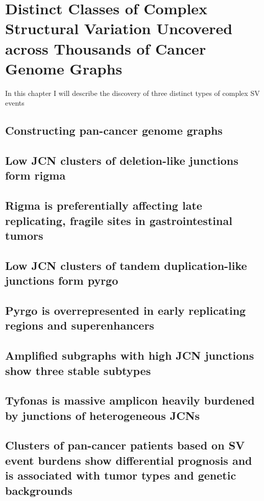 \documentclass[phd,tocprelim]{cornell}
\begin{document}
\chapter{Distinct Classes of Complex Structural Variation Uncovered across Thousands of Cancer Genome Graphs}
In this chapter I will describe the discovery of three distinct types of complex SV events 

\section{Constructing pan-cancer genome graphs}

\section{Low JCN clusters of deletion-like junctions form rigma}

\section{Rigma is preferentially affecting late replicating, fragile sites in gastrointestinal tumors}

\section{Low JCN clusters of tandem duplication-like junctions form pyrgo}

\section{Pyrgo is overrepresented in early replicating regions and superenhancers}

\section{Amplified subgraphs with high JCN junctions show three stable subtypes}

\section{Tyfonas is massive amplicon heavily burdened by junctions of heterogeneous JCNs}

\section{Clusters of pan-cancer patients based on SV event burdens show differential prognosis and is associated with tumor types and genetic backgrounds}
\end{document}
